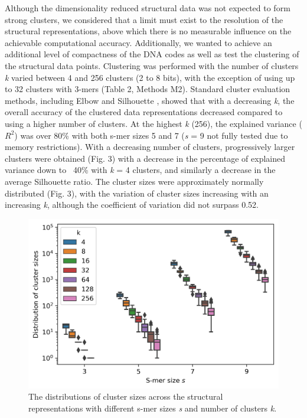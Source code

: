 \documentclass[sigconf]{acmart}
\begin{document}
Although the dimensionality reduced structural data was not expected to form strong clusters, we considered that a limit must exist to the resolution of the structural representations, above which there is no measurable influence on the achievable computational accuracy. Additionally, we wanted to achieve an additional level of compactness of the DNA codes as well as test the clustering of the structural data points. Clustering was performed with the number of clusters \textit{k} varied between 4 and 256 clusters (2 to 8 bits), with the exception of using up to 32 clusters with 3-mers (Table 2, Methods M2). Standard cluster evaluation methods, including Elbow and Silhouette \cite{Rousseeuw1987-mx}, showed that with a decreasing \textit{k}, the overall accuracy of the clustered data representations decreased compared to using a higher number of clusters. At the highest \textit{k} (256), the explained variance ($R^2$) was over 80\% with both s-mer sizes 5 and 7 (\textit{s} = 9 not fully tested due to memory restrictions). With a decreasing number of clusters, progressively larger clusters were obtained (Fig. 3) with a decrease in the percentage of explained variance down to ~40\% with \textit{k} = 4 clusters, and similarly a decrease in the average Silhouette ratio. The cluster sizes were approximately normally distributed (Fig. 3), with the variation of cluster sizes increasing with an increasing \textit{k},  although the coefficient of variation did not surpass 0.52.

\begin{figure}[ht]
  \centering
  \includegraphics[width=\linewidth]{smer_fig_cluster_distribution.png}
  \caption{The distributions of cluster sizes across the structural representations with different s-mer sizes \textit{s} and number of clusters \textit{k}.}
\end{figure}
\end{document}
